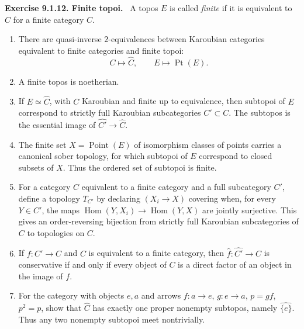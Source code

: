 \documentclass[11pt]{article}
\newcommand{\Hom}{\operatorname{Hom}}
\newcommand{\Point}{\operatorname{Point}}
\newcommand{\Ppoint}{\operatorname{Pt}}
\newenvironment{remarktext}[1]{\par\medskip\noindent\textbf{#1.}\ }{\par\medskip}
\begin{document}
\begin{remarktext}{Exercise 9.1.12. Finite topoi}
A topos \(E\) is called \emph{finite} if it is equivalent to \(\widehat C\) for a finite category \(C\).
\begin{enumerate}[label=\alph*)]
\item There are quasi-inverse \(2\)-equivalences between Karoubian categories equivalent to finite categories and finite topoi:
\[
C\longmapsto\widehat C,\qquad E\longmapsto\Ppoint(E).
\]
\item A finite topos is noetherian.
\item If \(E\simeq\widehat C\), with \(C\) Karoubian and finite up to equivalence, then subtopoi of \(E\) correspond to strictly full Karoubian subcategories \(C'\subset C\). The subtopos is the essential image of \(\widehat{C'}\to\widehat C\).
\item The finite set \(X=\Point(E)\) of isomorphism classes of points carries a canonical sober topology, for which subtopoi of \(E\) correspond to closed subsets of \(X\). Thus the ordered set of subtopoi is finite.
\item For a category \(C\) equivalent to a finite category and a full subcategory \(C'\), define a topology \(T_{C'}\) by declaring \((X_i\to X)\) covering when, for every \(Y\in C'\), the maps \(\Hom(Y,X_i)\to\Hom(Y,X)\) are jointly surjective. This gives an order-reversing bijection from strictly full Karoubian subcategories of \(C\) to topologies on \(C\).
\item If \(f:C'\to C\) and \(C\) is equivalent to a finite category, then \(\widehat f:\widehat{C'}\to\widehat C\) is conservative if and only if every object of \(C\) is a direct factor of an object in the image of \(f\).
\item For the category with objects \(e,a\) and arrows \(f:a\to e\), \(g:e\to a\), \(p=gf\), \(p^2=p\), show that \(\widehat C\) has exactly one proper nonempty subtopos, namely \(\widehat{\{e\}}\). Thus any two nonempty subtopoi meet nontrivially.
\end{enumerate}
\end{remarktext}
\end{document}
